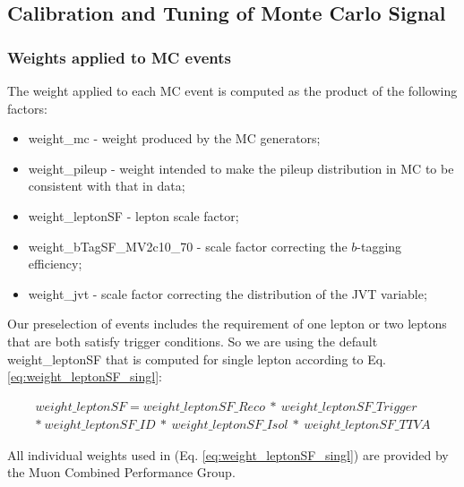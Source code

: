 

\subsection{Calibration and Tuning of Monte Carlo Signal}
\label{sec:calibration_and_tuning_of_Monte_Carlo_Signal}

\subsubsection{Weights applied to MC events}
\label{sec:Weights_applied_to_MC_events}

The weight applied to each MC event is computed as the product of the following factors:
\begin{itemize}
    \item {\selectfont weight\_mc} - weight produced by the MC generators;
    \item {\selectfont weight\_pileup} - weight intended to make the pileup distribution in MC to be consistent with that in data;
    \item {\selectfont weight\_leptonSF} - lepton scale factor;
    \item {\selectfont weight\_bTagSF\_MV2c10\_70} - scale factor correcting the $b$-tagging efficiency;
    \item {\selectfont weight\_jvt} - scale factor correcting the distribution of the {\selectfont JVT} variable;
\end{itemize}

Our preselection of events includes the requirement of one lepton or two leptons that are both satisfy trigger conditions.
So we are using the default {\selectfont weight\_leptonSF} that is computed for single lepton according to Eq. \ref{eq:weight_leptonSF_singl}:

\begin{multline}
    \label{eq:weight_leptonSF_singl}
    weight\_leptonSF = weight\_leptonSF\_Reco\ *\ weight\_leptonSF\_Trigger\ \\
    *\ weight\_leptonSF\_ID\ *\ weight\_leptonSF\_Isol\ *\ weight\_leptonSF\_TTVA
\end{multline}

All individual weights used in (Eq. \ref{eq:weight_leptonSF_singl}) are provided by the Muon Combined Performance Group.


